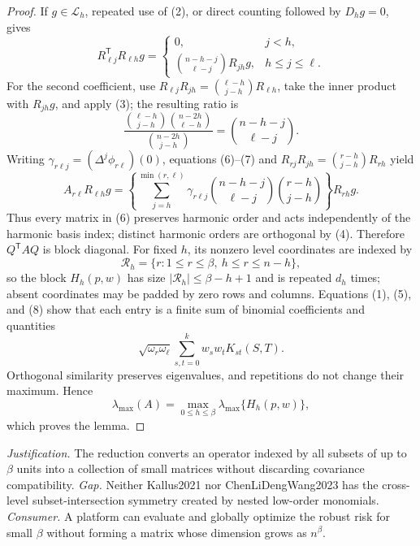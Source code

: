 \documentclass{article}
\begin{document}
\begin{proof}
If \(g\in\mathcal L_h\), repeated use of (2), or direct counting followed by \(D_hg=0\), gives
\[
R_{\ell j}^{\mathsf T}R_{\ell h}g
=\begin{cases}
0,&j<h,\\
\displaystyle\binom{n-h-j}{\ell-j}R_{jh}g,&h\le j\le\ell.
\end{cases}
\tag{7}
\]
For the second coefficient, use \(R_{\ell j}R_{jh}=\binom{\ell-h}{j-h}R_{\ell h}\), take the inner product with \(R_{jh}g\), and apply (3); the resulting ratio is
\[
\frac{\binom{\ell-h}{j-h}\binom{n-2h}{\ell-h}}
{\binom{n-2h}{j-h}}
=\binom{n-h-j}{\ell-j}.
\]
Writing \(\gamma_{r\ell j}=(\Delta^j\phi_{r\ell})(0)\), equations (6)--(7) and \(R_{rj}R_{jh}=\binom{r-h}{j-h}R_{rh}\) yield
\[
A_{r\ell}R_{\ell h}g
=\left\{
\sum_{j=h}^{\min(r,\ell)}
\gamma_{r\ell j}
\binom{n-h-j}{\ell-j}
\binom{r-h}{j-h}
\right\}R_{rh}g.
\tag{8}
\]
Thus every matrix in (6) preserves harmonic order and acts independently of the harmonic basis index; distinct harmonic orders are orthogonal by (4).  Therefore \(Q^{\mathsf T}AQ\) is block diagonal.  For fixed \(h\), its nonzero level coordinates are indexed by
\[
\mathcal R_h=\{r:1\le r\le\beta,\ h\le r\le n-h\},
\]
so the block \(H_h(p,w)\) has size \(|\mathcal R_h|\le\beta-h+1\) and is repeated \(d_h\) times; absent coordinates may be padded by zero rows and columns.  Equations (1), (5), and (8) show that each entry is a finite sum of binomial coefficients and quantities
\[
\sqrt{\omega_r\omega_\ell}\sum_{s,t=0}^kw_sw_tK_{st}(S,T).
\]
Orthogonal similarity preserves eigenvalues, and repetitions do not change their maximum.  Hence
\[
\lambda_{\max}(A)
=\max_{0\le h\le\beta}\lambda_{\max}\{H_h(p,w)\},
\]
which proves the lemma.
\end{proof}
\par\smallskip\noindent \textit{Justification.} The reduction converts an operator indexed by all subsets of up to \(\beta\) units into a collection of small matrices without discarding covariance compatibility. \textit{Gap.} Neither Kallus2021 nor ChenLiDengWang2023 has the cross-level subset-intersection symmetry created by nested low-order monomials. \textit{Consumer.} A platform can evaluate and globally optimize the robust risk for small \(\beta\) without forming a matrix whose dimension grows as \(n^\beta\).
\end{document}
